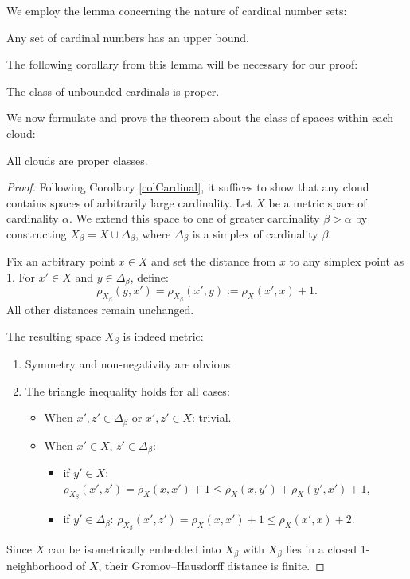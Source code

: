 \documentclass[leqno]{article}
\begin{document}
We employ the lemma concerning the nature of cardinal number sets:

\begin{lemma}
Any set of cardinal numbers has an upper bound.
\end{lemma}

The following corollary from this lemma will be necessary for our proof:

\begin{corollary}\label{colCardinal}
The class of unbounded cardinals is proper.
\end{corollary}

We now formulate and prove the theorem about the class of spaces within each cloud:

\begin{theorem}
All clouds are proper classes.
\end{theorem}

\begin{proof}
Following Corollary \ref{colCardinal}, it suffices to show that any cloud contains spaces of arbitrarily large cardinality. Let $X$ be a metric space of cardinality $\alpha$. We extend this space to one of greater cardinality $\beta > \alpha$ by constructing $X_\beta = X \cup \Delta_\beta$, where $\Delta_\beta$ is a simplex of cardinality $\beta$.

Fix an arbitrary point $x \in X$ and set the distance from $x$ to any simplex point as 1. For $x' \in X$ and $y \in \Delta_\beta$, define:
$$
\rho_{X_\beta}(y,x') = \rho_{X_\beta}(x',y) := \rho_X(x',x) + 1.
$$
All other distances remain unchanged.

The resulting space $X_\beta$ is indeed metric:
\begin{enumerate}
\item Symmetry and non-negativity are obvious
\item The triangle inequality holds for all cases:
\begin{itemize}
\item When $x', z' \in \Delta_\beta$ or $x', z' \in X$: trivial.
\item When $x' \in X$, $z' \in \Delta_\beta$:
\begin{itemize}
\item if $y' \in X$: $\rho_{X_\beta}(x',z') = \rho_X(x,x') + 1 \leq \rho_X(x,y') + \rho_X(y',x') + 1$,
\item if $y' \in \Delta_\beta$: $\rho_{X_\beta}(x',z') = \rho_X(x,x') + 1 \leq \rho_X(x',x) + 2$.
\end{itemize}
\end{itemize}
\end{enumerate}

Since $X$ can be isometrically embedded into $X_\beta$ with $X_\beta$ lies in a closed 1-neighborhood of $X$, their Gromov--Hausdorff distance is finite.
\end{proof}
\end{document}
